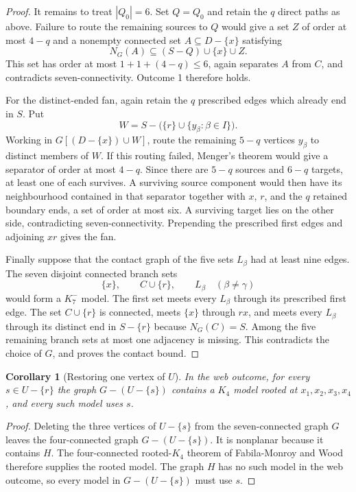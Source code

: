 \documentclass[11pt]{amsart}
\newtheorem{corollary}[theorem]{Corollary}
\begin{document}
\begin{proof}
It remains to treat $|Q_0|=6$.  Set $Q=Q_0$ and retain the $q$ direct
paths as above.  Failure to route the remaining sources to $Q$ would give
a set $Z$ of order at most $4-q$ and a nonempty connected set
$A\subseteq D-\{x\}$ satisfying
\[
             N_G(A)\subseteq(S-Q)\cup\{x\}\cup Z.
\]
This set has order at most $1+1+(4-q)\leq6$, again separates $A$ from
$C$, and contradicts seven-connectivity.  Outcome 1 therefore holds.

For the distinct-ended fan, again retain the $q$ prescribed edges which
already end in $S$.  Put
\[
        W=S-\bigl(\{r\}\cup\{y_\beta:\beta\in I\}\bigr).
\]
Working in $G[(D-\{x\})\cup W]$, route the remaining $5-q$ vertices
$y_\beta$ to distinct members of $W$.  If this routing failed, Menger's theorem would
give a separator of order at most $4-q$.  Since there are $5-q$ sources
and $6-q$ targets, at least one of each survives.  A surviving source
component would then have its
neighbourhood contained in that separator together with $x$, $r$, and the
$q$ retained boundary ends, a set of order at most six.  A surviving
target lies on the other side, contradicting seven-connectivity.
Prepending the prescribed first edges and adjoining $xr$ gives the fan.

Finally suppose that the contact graph of the five sets $L_\beta$ had at
least nine edges.  The seven disjoint connected branch sets
\[
             \{x\},\qquad C\cup\{r\},\qquad
             L_\beta\quad(\beta\ne\gamma)
\]
would form a $K_7^{-}$ model.  The first set meets every $L_\beta$ through
its prescribed first edge.  The set $C\cup\{r\}$ is connected, meets
$\{x\}$ through $rx$, and meets every $L_\beta$ through its distinct end
in $S-\{r\}$ because $N_G(C)=S$.  Among the five remaining
branch sets at most one adjacency is missing.  This contradicts the choice
of $G$, and proves the contact bound.
\end{proof}

\begin{corollary}[Restoring one vertex of $U$]\label{cor:named-centre-repair}
In the web outcome, for every $s\in U-\{r\}$ the graph
$G-(U-\{s\})$ contains a $K_4$ model rooted at
$x_1,x_2,x_3,x_4$, and every such model uses $s$.
\end{corollary}

\begin{proof}
Deleting the three vertices of $U-\{s\}$ from the seven-connected graph
$G$ leaves the four-connected graph $G-(U-\{s\})$.  It is nonplanar because
it contains $H$.  The four-connected rooted-$K_4$ theorem of
Fabila-Monroy and Wood~\cite[Theorem~6]{FabilaMonroyWood2013} therefore
supplies the rooted model.  The graph $H$ has no such model in the web
outcome, so every model in $G-(U-\{s\})$ must use $s$.
\end{proof}
\end{document}
